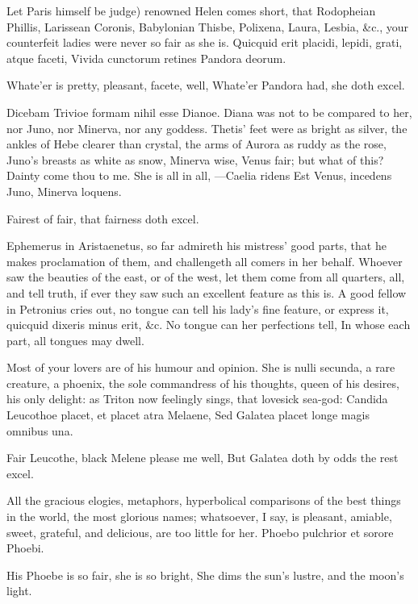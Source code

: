 {Let Paris himself be judge) renowned Helen comes short, that Rodopheian
Phillis, Larissean Coronis, Babylonian Thisbe, Polixena, Laura, Lesbia,
\&c., your counterfeit ladies were never so fair as she is.
Quicquid erit placidi, lepidi, grati, atque faceti,
Vivida cunctorum retines Pandora deorum.

Whate'er is pretty, pleasant, facete, well,
Whate'er Pandora had, she doth excel.

Dicebam Trivioe formam nihil esse Dianoe. Diana was not to be
compared to her, nor Juno, nor Minerva, nor any goddess. Thetis' feet
were as bright as silver, the ankles of Hebe clearer than crystal, the
arms of Aurora as ruddy as the rose, Juno's breasts as white as snow,
Minerva wise, Venus fair; but what of this? Dainty come thou to me. She
is all in all,
---Caelia ridens
Est Venus, incedens Juno, Minerva loquens.

Fairest of fair, that fairness doth excel.

Ephemerus in Aristaenetus, so far admireth his mistress' good parts,
that he makes proclamation of them, and challengeth all comers in her
behalf. Whoever saw the beauties of the east, or of the west, let
them come from all quarters, all, and tell truth, if ever they saw such
an excellent feature as this is. A good fellow in Petronius cries out,
no tongue can tell his lady's fine feature, or express it,
quicquid dixeris minus erit, \&c.
No tongue can her perfections tell,
In whose each part, all tongues may dwell.

Most of your lovers are of his humour and opinion. She is nulli
secunda, a rare creature, a phoenix, the sole commandress of his
thoughts, queen of his desires, his only delight: as Triton now
feelingly sings, that lovesick sea-god:
Candida Leucothoe placet, et placet atra Melaene,
Sed Galatea placet longe magis omnibus una.

Fair Leucothe, black Melene please me well,
But Galatea doth by odds the rest excel.

All the gracious elogies, metaphors, hyperbolical comparisons of the
best things in the world, the most glorious names; whatsoever, I say,
is pleasant, amiable, sweet, grateful, and delicious, are too little
for her.
Phoebo pulchrior et sorore Phoebi.

His Phoebe is so fair, she is so bright,
She dims the sun's lustre, and the moon's light.

}
